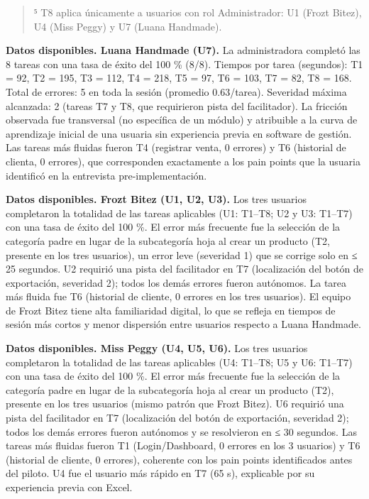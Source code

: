 \begin{quote}
⁵ T8 aplica únicamente a usuarios con rol Administrador: U1 (Frozt Bitez), U4 (Miss Peggy) y U7 (Luana Handmade).
\end{quote}

\textbf{Datos disponibles. Luana Handmade (U7).} La administradora completó las 8 tareas con una tasa de éxito del 100 \% (8/8). Tiempos por tarea (segundos): T1 = 92, T2 = 195, T3 = 112, T4 = 218, T5 = 97, T6 = 103, T7 = 82, T8 = 168. Total de errores: 5 en toda la sesión (promedio 0.63/tarea). Severidad máxima alcanzada: 2 (tareas T7 y T8, que requirieron pista del facilitador). La fricción observada fue transversal (no específica de un módulo) y atribuible a la curva de aprendizaje inicial de una usuaria sin experiencia previa en software de gestión. Las tareas más fluidas fueron T4 (registrar venta, 0 errores) y T6 (historial de clienta, 0 errores), que corresponden exactamente a los pain points que la usuaria identificó en la entrevista pre-implementación.

\textbf{Datos disponibles. Frozt Bitez (U1, U2, U3).} Los tres usuarios completaron la totalidad de las tareas aplicables (U1: T1--T8; U2 y U3: T1--T7) con una tasa de éxito del 100 \%. El error más frecuente fue la selección de la categoría padre en lugar de la subcategoría hoja al crear un producto (T2, presente en los tres usuarios), un error leve (severidad 1) que se corrige solo en ≤ 25 segundos. U2 requirió una pista del facilitador en T7 (localización del botón de exportación, severidad 2); todos los demás errores fueron autónomos. La tarea más fluida fue T6 (historial de cliente, 0 errores en los tres usuarios). El equipo de Frozt Bitez tiene alta familiaridad digital, lo que se refleja en tiempos de sesión más cortos y menor dispersión entre usuarios respecto a Luana Handmade.

\textbf{Datos disponibles. Miss Peggy (U4, U5, U6).} Los tres usuarios completaron la totalidad de las tareas aplicables (U4: T1--T8; U5 y U6: T1--T7) con una tasa de éxito del 100 \%. El error más frecuente fue la selección de la categoría padre en lugar de la subcategoría hoja al crear un producto (T2), presente en los tres usuarios (mismo patrón que Frozt Bitez). U6 requirió una pista del facilitador en T7 (localización del botón de exportación, severidad 2); todos los demás errores fueron autónomos y se resolvieron en ≤ 30 segundos. Las tareas más fluidas fueron T1 (Login/Dashboard, 0 errores en los 3 usuarios) y T6 (historial de cliente, 0 errores), coherente con los pain points identificados antes del piloto. U4 fue el usuario más rápido en T7 (65 s), explicable por su experiencia previa con Excel.

